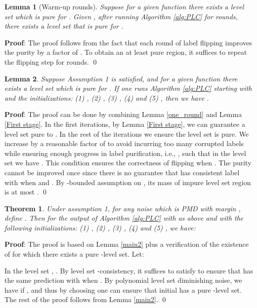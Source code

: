\documentclass{article} \usepackage{iclr2021_conference,times}
\newtheorem{theorem}{Theorem}
\newtheorem{lemma}{Lemma}
\begin{document}
\begin{lemma}[Warm-up rounds]
Suppose for a given function  there exists a level set  which is pure for . Given , after running Algorithm \ref{alg:PLC} for  rounds, there exists a level set  that is pure for . 
\end{lemma}
\textbf{Proof}:
The proof follows from the fact that each round of label flipping improves the purity by a factor of . To obtain an at least  pure region, it suffices to repeat the flipping step for  rounds. \qed

\begin{lemma} 
Suppose Assumption 1 is satisfied, and for a given function  there exists a level set  which is pure for . If one runs Algorithm \ref{alg:PLC} starting with  and the initializations: (1) , (2) , (3) , (4)  and (5) , then we have .
\end{lemma}

\textbf{Proof}:
The proof can be done by combining Lemma \ref{one_round} and Lemma \ref{First stage}. In the first  iterations, by Lemma \ref{First stage}, we can guarantee a level set   pure to .  In the rest of the iterations we ensure the level set  is pure. We increase  by a reasonable factor of  to avoid incurring too many corrupted labels while ensuring enough progress in label purification, i.e., , such that in the level set  we have . This condition ensures the correctness of flipping  when . 
The purity cannot be improved once  since there is no guarantee that  has consistent label with  when  and . By -bounded assumption on , its mass of impure  level set region is at most .
\qed

\begin{theorem} 
Under assumption 1, for any noise  which is PMD with margin , define . Then for the output of Algorithm \ref{alg:PLC}
 with  as above and with the following initializations: (1) , (2) , (3) , (4)  and (5)  , we have: 
\end{theorem}


\textbf{Proof}:
The proof is based on Lemma \ref{main2} plus a verification of the existence of  for which there exists a pure -level set. Let:

In the level set , . By level set -consistency, it suffices to satisfy   to ensure that   has the same prediction with  when . By polynomial level set diminishing noise, we have  if , and thus by choosing  one can ensure that initial  has a pure -level set. The rest of the proof follows from Lemma \ref{main2}.
\qed
\end{document}
